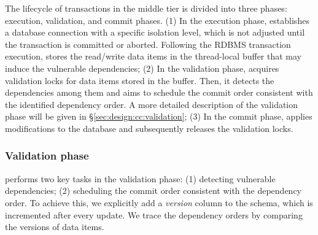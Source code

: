 
The lifecycle of transactions in the middle tier is divided into three phases: execution, validation, and commit phases.
(1) In the execution phase, \sysname establishes a database connection with a specific isolation level, which is not adjusted until the transaction is committed or aborted. 
Following the RDBMS transaction execution, \sysname stores the read/write data items in the thread-local buffer that may induce the vulnerable dependencies;
(2) In the validation phase, \sysname acquires validation locks for data items stored in the buffer. Then, it detects the dependencies among them and aims to schedule the commit order consistent with the identified dependency order.
A more detailed description of the validation phase will be given in \S\ref{sec:design:cc:validation}; 
(3) In the commit phase, \sysname applies modifications to the database and subsequently releases the validation locks. 


\subsubsection{Validation phase\label{sec:design:cc:validation}} \sysname performs two key tasks in the validation phase: (1) detecting vulnerable dependencies; (2) scheduling the commit order consistent with the dependency order. 
To achieve this, we explicitly add a \textit{version} column to the schema, which is incremented after every update.
We trace the dependency orders by comparing the versions of data items. 


